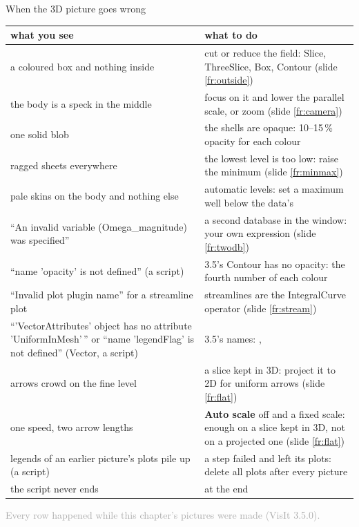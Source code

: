 \documentclass[aspectratio=169,11pt]{beamer}
\newcommand{\sourcecredit}[1]{\vfill\begin{flushright}\tiny\textcolor{DarkGray}{#1}\end{flushright}}
\newcommand{\gui}[1]{\textsf{\textbf{#1}}}
\begin{document}
\begin{frame}{When the 3D picture goes wrong}
\label{fr:trouble}
\scriptsize
\begin{tabular}{@{}L{0.4\textwidth}L{0.55\textwidth}@{}}
\toprule
what you see & what to do \\
\midrule
a coloured box and nothing inside & cut or reduce the field: Slice, ThreeSlice, Box, Contour (slide \ref{fr:outside}) \\
the body is a speck in the middle & focus on it and lower the parallel scale, or zoom (slide \ref{fr:camera}) \\
one solid blob & the shells are opaque: 10--15\,\% opacity for each colour \\
ragged sheets everywhere & the lowest level is too low: raise the minimum (slide \ref{fr:minmax}) \\
pale skins on the body and nothing else & automatic levels: set a maximum well below the data's \\
``An invalid variable (Omega\_magnitude) was specified'' & a second database in the window: your own expression (slide \ref{fr:twodb}) \\
``name 'opacity' is not defined'' (a script) & 3.5's Contour has no opacity: the fourth number of each colour \\
``Invalid plot plugin name'' for a streamline plot & streamlines are the IntegralCurve operator (slide \ref{fr:stream}) \\
``'VectorAttributes' object has no attribute 'UniformInMesh'\,'' or ``name 'legendFlag' is not defined'' (Vector, a script) & 3.5's names: ,  \\
arrows crowd on the fine level & a slice kept in 3D: project it to 2D for uniform arrows (slide \ref{fr:flat}) \\
one speed, two arrow lengths & \gui{Auto scale} off and a fixed scale: enough on a slice kept in 3D, not on a projected one (slide \ref{fr:flat}) \\
legends of an earlier picture's plots pile up (a script) & a step failed and left its plots: delete all plots after every picture \\
the script never ends &  at the end \\
\bottomrule
\end{tabular}
\sourcecredit{Every row happened while this chapter's pictures were made (VisIt 3.5.0).}
\end{frame}
\end{document}
